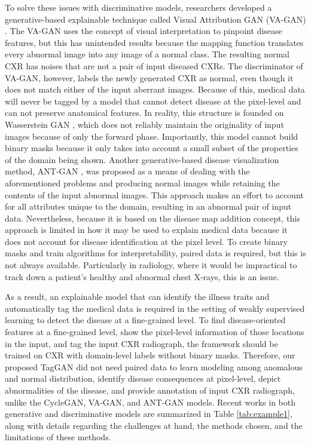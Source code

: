 {To solve these issues with discriminative models, researchers developed a generative-based explainable technique called Visual Attribution GAN (VA-GAN) \cite{15}. The VA-GAN uses the concept of visual interpretation to pinpoint disease features, but this has unintended results because the mapping function translates every abnormal image into any image of a normal class. The resulting normal CXR has noises that are not a pair of input diseased CXRs. The discriminator of VA-GAN, however, labels the newly generated CXR as normal, even though it does not match either of the input aberrant images. Because of this, medical data will never be tagged by a model that cannot detect disease at the pixel-level and can not preserve anatomical features. In reality, this structure is founded on Wasserstein GAN \cite{29}, which does not reliably maintain the originality of input images because of only the forward phase. Importantly, this model cannot build binary masks because it only takes into account a small subset of the properties of the domain being shown. Another generative-based disease visualization method, ANT-GAN \cite{16}, was proposed as a means of dealing with the aforementioned problems and producing normal images while retaining the contents of the input abnormal images. This approach makes an effort to account for all attributes unique to the domain, resulting in an abnormal pair of input data. Nevertheless, because it is based on the disease map addition concept, this approach is limited in how it may be used to explain medical data because it does not account for disease identification at the pixel level. To create binary masks and train algorithms for interpretability, paired data is required, but this is not always available. Particularly in radiology, where it would be impractical to track down a patient's healthy and abnormal chest X-rays, this is an issue. 

As a result, an explainable model that can identify the illness traits and automatically tag the medical data is required in the setting of weakly supervised learning to detect the disease at a fine-grained level. To find disease-oriented features at a fine-grained level, show the pixel-level information of those locations in the input, and tag the input CXR radiograph, the framework should be trained on CXR with domain-level labels without binary masks. Therefore, our proposed TagGAN did not need paired data to learn modeling among anomalous and normal distribution, identify disease consequences at pixel-level, depict abnormalities of the disease, and provide annotation of input CXR radiograph, unlike the CycleGAN, VA-GAN, and ANT-GAN models. Recent works in both generative and discriminative models are summarized in Table \ref{tab:example1}, along with details regarding the challenges at hand, the methods chosen, and the limitations of these methods.

}
